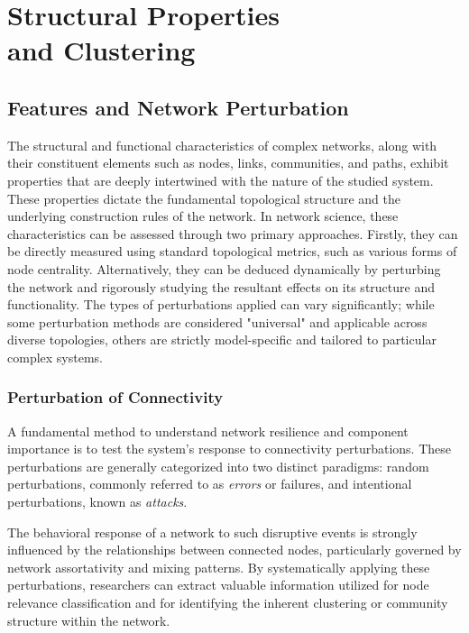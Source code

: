 \chapter[Structural Properties and Clustering]{Structural Properties\\and Clustering}

\section{Features and Network Perturbation}
\label{sec:features_perturbation}

The structural and functional characteristics of complex networks, along with their constituent elements such as nodes, links, communities, and paths, exhibit properties that are deeply intertwined with the nature of the studied system. These properties dictate the fundamental topological structure and the underlying construction rules of the network. In network science, these characteristics can be assessed through two primary approaches. Firstly, they can be directly measured using standard topological metrics, such as various forms of node centrality. Alternatively, they can be deduced dynamically by perturbing the network and rigorously studying the resultant effects on its structure and functionality. The types of perturbations applied can vary significantly; while some perturbation methods are considered "universal" and applicable across diverse topologies, others are strictly model-specific and tailored to particular complex systems.

\subsection{Perturbation of Connectivity}
\label{subsec:perturbation_connectivity}

A fundamental method to understand network resilience and component importance is to test the system's response to connectivity perturbations. These perturbations are generally categorized into two distinct paradigms: random perturbations, commonly referred to as \textit{errors} or failures, and intentional perturbations, known as \textit{attacks}.

The behavioral response of a network to such disruptive events is strongly influenced by the relationships between connected nodes, particularly governed by network assortativity and mixing patterns. By systematically applying these perturbations, researchers can extract valuable information utilized for node relevance classification and for identifying the inherent clustering or community structure within the network.

